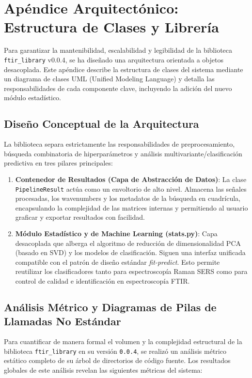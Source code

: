 \section{Apéndice Arquitectónico: Estructura de Clases y Librería}
Para garantizar la mantenibilidad, escalabilidad y legibilidad de la biblioteca \texttt{ftir\_library} v0.0.4, se ha diseñado una arquitectura orientada a objetos desacoplada. Este apéndice describe la estructura de clases del sistema mediante un diagrama de clases UML (Unified Modeling Language) y detalla las responsabilidades de cada componente clave, incluyendo la adición del nuevo módulo estadístico.

\subsection{Diseño Conceptual de la Arquitectura}
La biblioteca separa estrictamente las responsabilidades de preprocesamiento, búsqueda combinatoria de hiperparámetros y análisis multivariante/clasificación predictiva en tres pilares principales:
\begin{enumerate}
    \item \textbf{Contenedor de Resultados (Capa de Abstracción de Datos)}: La clase \texttt{PipelineResult} actúa como un envoltorio de alto nivel. Almacena las señales procesadas, los wavenumbers y los metadatos de la búsqueda en cuadrícula, encapsulando la complejidad de las matrices internas y permitiendo al usuario graficar y exportar resultados con facilidad.
    \item \textbf{Módulo Estadístico y de Machine Learning (stats.py)}: Capa desacoplada que alberga el algoritmo de reducción de dimensionalidad PCA (basado en SVD) y los modelos de clasificación. Siguen una interfaz unificada compatible con el patrón de diseño estándar \textit{fit-predict}. Esto permite reutilizar los clasificadores tanto para espectroscopía Raman SERS como para control de calidad e identificación en espectroscopía FTIR.
\end{enumerate}

\subsection{Análisis Métrico y Diagramas de Pilas de Llamadas No Estándar}
Para cuantificar de manera formal el volumen y la complejidad estructural de la biblioteca \texttt{ftir\_library} en su versión \texttt{0.0.4}, se realizó un análisis métrico estático completo de su árbol de directorios de código fuente. Los resultados globales de este análisis revelan las siguientes métricas del sistema:

